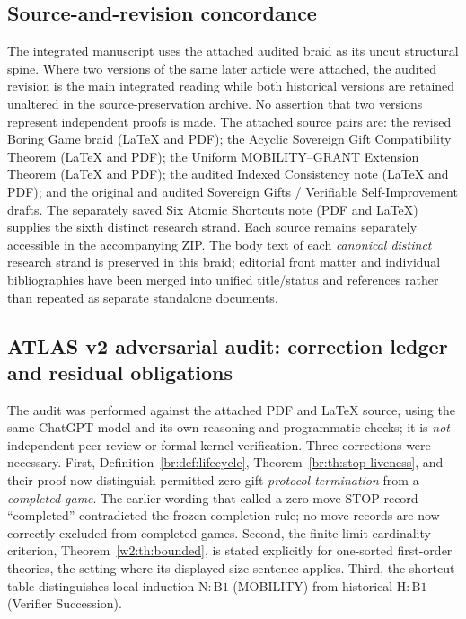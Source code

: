 \documentclass[11pt,letterpaper]{article}
\theoremstyle{definition}\newtheorem{definition}[theorem]{Definition}\newtheorem{example}[theorem]{Example}
\theoremstyle{remark}\newtheorem{remark}[theorem]{Remark}
\begin{document}
\subsection{Source-and-revision concordance}\label{br:sec:source-concordance}
The integrated manuscript uses the attached audited braid as its uncut structural spine. Where two versions of the same later article were attached, the audited revision is the main integrated reading while both historical versions are retained unaltered in the source-preservation archive. No assertion that two versions represent independent proofs is made. The attached source pairs are: the revised Boring Game braid (LaTeX and PDF); the Acyclic Sovereign Gift Compatibility Theorem (LaTeX and PDF); the Uniform MOBILITY--GRANT Extension Theorem (LaTeX and PDF); the audited Indexed Consistency note (LaTeX and PDF); and the original and audited Sovereign Gifts / Verifiable Self-Improvement drafts. The separately saved Six Atomic Shortcuts note (PDF and LaTeX) supplies the sixth distinct research strand. Each source remains separately accessible in the accompanying ZIP. The body text of each \emph{canonical distinct} research strand is preserved in this braid; editorial front matter and individual bibliographies have been merged into unified title/status and references rather than repeated as separate standalone documents.

\subsection{ATLAS v2 adversarial audit: correction ledger and residual obligations}\label{br:sec:atlas-audit}
The audit was performed against the attached PDF and LaTeX source, using the same
ChatGPT model and its own reasoning and programmatic checks; it is \emph{not}
independent peer review or formal kernel verification. Three corrections were
necessary. First, Definition~\ref{br:def:lifecycle}, Theorem~\ref{br:th:stop-liveness},
and their proof now distinguish permitted zero-gift \emph{protocol termination}
from a \emph{completed game}. The earlier wording that called a zero-move STOP
record ``completed'' contradicted the frozen completion rule; no-move records
are now correctly excluded from completed games. Second, the finite-limit
cardinality criterion, Theorem~\ref{w2:th:bounded}, is stated explicitly
for one-sorted first-order theories, the setting where its displayed size
sentence applies. Third, the shortcut table distinguishes local induction
\(\mathrm{N{:}B1}\) (MOBILITY) from historical \(\mathrm{H{:}B1}\)
(Verifier Succession).
\end{document}
